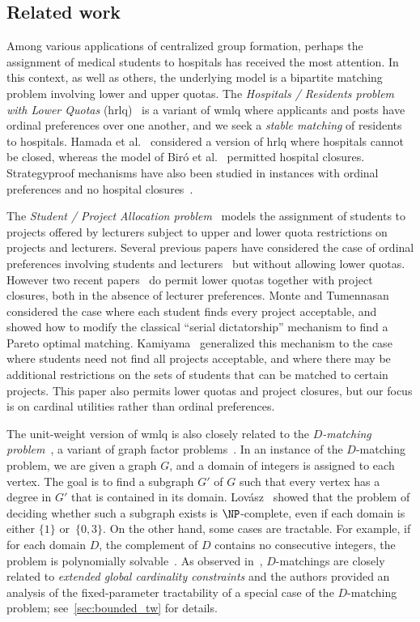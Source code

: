 \documentclass{llncs}
\begin{document}
\subsection{Related work}\label{sec:rWork}

Among various applications of centralized group formation, perhaps the assignment of medical students to hospitals has received the most attention. In this context, as well as others, the underlying model is a bipartite matching problem involving lower and upper quotas. The \emph{Hospitals / Residents problem with Lower Quotas} ({\sc hrlq})~\cite{BFIM10,HIM14} is a variant of {\sc wmlq} where applicants and posts have ordinal preferences over one another, and we seek a \emph{stable matching} of residents to hospitals. Hamada et al.~\cite{HIM14} considered a version of {\sc hrlq} where hospitals cannot be closed, whereas the model of Bir\'o et al.~\cite{BFIM10} permitted hospital closures. Strategyproof mechanisms have also been studied in instances with ordinal preferences and no hospital closures~\cite{FITUY15,GHIKUYY14,GKHIY15}.

The \emph{Student / Project Allocation problem}~\cite[Section 5.6]{Man13} models the assignment of students to projects offered by lecturers subject to upper and lower quota restrictions on projects and lecturers. Several previous papers have considered the case of ordinal preferences involving students and lecturers~\cite{AIM07,IMY12,MO08} but without allowing lower quotas. However two recent papers~\cite{Kam13,MT13} do permit lower quotas together with project closures, both in the absence of lecturer preferences. Monte and Tumennasan~\cite{MT13} considered the case where each student finds every project acceptable, and showed how to modify the classical ``serial dictatorship'' mechanism to find a Pareto optimal matching. Kamiyama~\cite{Kam13} generalized this mechanism to the case where students need not find all projects acceptable, and where there may be additional restrictions on the sets of students that can be matched to certain projects. This paper also permits lower quotas and project closures, but our focus is on cardinal utilities rather than  ordinal preferences.

The unit-weight version of {\sc wmlq} is also closely related to the \emph{$D$-matching problem}~\cite{Cor88,Lov73,Seb93}, a variant of graph factor problems~\cite{Plu07}.  In an instance of the $D$-matching problem, we are given a graph $G$, and a domain of integers is assigned to each vertex. The goal is to find a subgraph $G'$ of $G$ such that every vertex has a degree in $G'$ that is contained in its domain. Lov\'asz~\cite{Lov72} showed that the problem of deciding whether such a subgraph exists is $\NP$-complete, even if each domain is either $\{1\}$ or~$\{0,3\}$. On the other hand, some cases are tractable.  For example, if for each domain $D$, the complement of $D$ contains no consecutive integers, the problem is polynomially solvable~\cite{Seb93}. 
As observed in~\cite{SS11}, $D$-matchings are closely related to \emph{extended global cardinality constraints} and the authors provided an analysis of the fixed-parameter tractability of a special case of the $D$-matching problem; see~\cref{sec:bounded_tw} for details.
\end{document}
